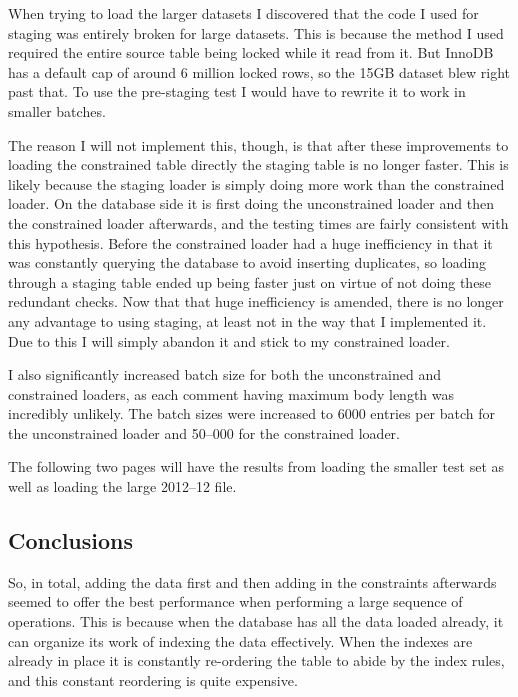 When trying to load the larger datasets I discovered that the code I used for staging was entirely broken for large datasets.
This is because the method I used required the entire source table being locked while it read from it.
But InnoDB has a default cap of around 6 million locked rows, so the 15GB dataset blew right past that.
To use the pre-staging test I would have to rewrite it to work in smaller batches.

The reason I will not implement this, though, is that after these improvements to loading the constrained table directly the staging table is no longer faster.
This is likely because the staging loader is simply doing more work than the constrained loader.
On the database side it is first doing the unconstrained loader and then the constrained loader afterwards, and the testing times are fairly consistent with this hypothesis.
Before the constrained loader had a huge inefficiency in that it was constantly querying the database to avoid inserting duplicates, so loading through a staging table ended up being faster just on virtue of not doing these redundant checks.
Now that that huge inefficiency is amended, there is no longer any advantage to using staging, at least not in the way that I implemented it.
Due to this I will simply abandon it and stick to my constrained loader.

I also significantly increased batch size for both the unconstrained and constrained loaders, as each comment having maximum body length was incredibly unlikely.
The batch sizes were increased to 6000 entries per batch for the unconstrained loader and 50--000 for the constrained loader.

The following two pages will have the results from loading the smaller test set as well as loading the large 2012--12 file.

\subsection{Conclusions}\label{subsec:loading_conclusions}

So, in total, adding the data first and then adding in the constraints afterwards seemed to offer the best performance when performing a large sequence of
operations.
This is because when the database has all the data loaded already, it can organize its work of indexing the data effectively.
When the indexes are already in place it is constantly re-ordering the table to abide by the index rules, and this constant reordering is quite expensive.


